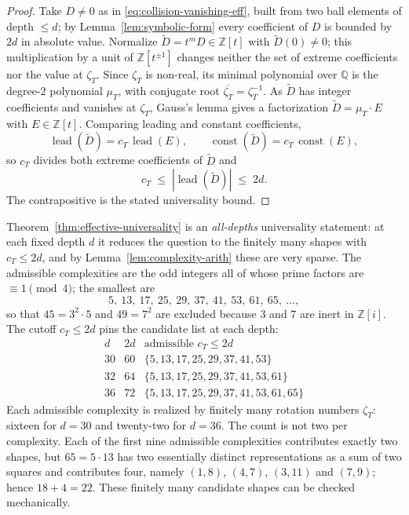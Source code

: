 \documentclass[11pt]{article}
\theoremstyle{plain}
\theoremstyle{definition}
\theoremstyle{remark}
\begin{document}
\begin{proof}
Take $D \ne 0$ as in \eqref{eq:collision-vanishing-eff}, built from two
ball elements of depth $\le d$; by Lemma~\ref{lem:symbolic-form} every
coefficient of $D$ is bounded by $2d$ in absolute value. Normalize
$\widetilde D = t^m D \in \mathbb{Z}[t]$ with $\widetilde D(0) \ne 0$;
this multiplication by a unit of $\mathbb{Z}[t^{\pm 1}]$ changes
neither the set of extreme coefficients nor the value at $\zeta_T$.
Since $\zeta_T$ is non-real, its minimal polynomial over $\mathbb{Q}$ is
the degree-$2$ polynomial $\mu_T$, with conjugate root
$\overline{\zeta_T} = \zeta_T^{-1}$. As $\widetilde D$ has integer
coefficients and vanishes at $\zeta_T$, Gauss's lemma gives a
factorization $\widetilde D = \mu_T \cdot E$ with $E \in \mathbb{Z}[t]$.
Comparing leading and constant coefficients,
\[
\operatorname{lead}(\widetilde D) = c_T \,\operatorname{lead}(E),
\qquad
\operatorname{const}(\widetilde D) = c_T \,\operatorname{const}(E),
\]
so $c_T$ divides both extreme coefficients of $\widetilde D$ and
\[
c_T \;\le\; |\operatorname{lead}(\widetilde D)| \;\le\; 2d .
\]
The contrapositive is the stated universality bound.
\end{proof}

Theorem~\ref{thm:effective-universality} is an \emph{all-depths}
universality statement: at each fixed depth $d$ it reduces the question
to the finitely many shapes with $c_T \le 2d$, and by
Lemma~\ref{lem:complexity-arith} these are very sparse. The admissible
complexities are the odd integers all of whose prime factors are
$\equiv 1 \pmod 4$; the smallest are
\[
5,\ 13,\ 17,\ 25,\ 29,\ 37,\ 41,\ 53,\ 61,\ 65,\ \ldots,
\]
so that $45 = 3^2 \cdot 5$ and $49 = 7^2$ are excluded because $3$ and
$7$ are inert in $\mathbb{Z}[i]$. The cutoff $c_T \le 2d$ pins the
candidate list at each depth:
\[
\begin{array}{c|c|c}
d & 2d & \text{admissible } c_T \le 2d \\\hline
30 & 60 & \{5, 13, 17, 25, 29, 37, 41, 53\} \\
32 & 64 & \{5, 13, 17, 25, 29, 37, 41, 53, 61\} \\
36 & 72 & \{5, 13, 17, 25, 29, 37, 41, 53, 61, 65\}
\end{array}
\]
Each admissible complexity is realized by finitely many rotation
numbers $\zeta_T$: sixteen for $d = 30$ and twenty-two for $d = 36$.
The count is not two per complexity. Each of the first nine admissible
complexities contributes exactly two shapes, but $65 = 5\cdot13$ has two
essentially distinct representations as a sum of two squares and contributes
four, namely $(1,8)$, $(4,7)$, $(3,11)$ and $(7,9)$; hence $18 + 4 = 22$.
These finitely many candidate shapes can be checked mechanically.
\end{document}
